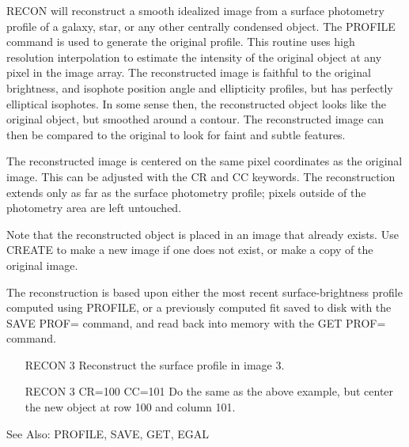RECON will reconstruct a smooth idealized image from a surface photometry
profile of a galaxy, star, or any other centrally condensed object. The
PROFILE command is used to generate the original profile.  This routine
uses high resolution interpolation to estimate the intensity of the
original object at any pixel in the image array.  The reconstructed image
is faithful to the original brightness, and isophote position angle and
ellipticity profiles, but has perfectly elliptical isophotes.  In some
sense then, the reconstructed object looks like the original object, but
smoothed around a contour.  The reconstructed image can then be compared to
the original to look for faint and subtle features.

The reconstructed image is centered on the same pixel coordinates as the
original image. This can be adjusted with the CR and CC keywords. The
reconstruction extends only as far as the surface photometry profile;
pixels outside of the photometry area are left untouched.

Note that the reconstructed object is placed in an image that already
exists.  Use CREATE to make a new image if one does not exist, or make a
copy of the original image.

The reconstruction is based upon either the most recent surface-brightness
profile computed using PROFILE, or a previously computed fit saved to disk
with the SAVE PROF= command, and read back into memory with the GET PROF=
command.

\begin{itemize}
  \item[RECON 3\hfill]{Reconstruct the surface profile in image 3.}

  \item[RECON 3 CR=100 CC=101\hfill]{Do the same as the above example,
       but center the new object at row 100 and column 101.}
\end{itemize}

See Also: PROFILE, SAVE, GET, EGAL


